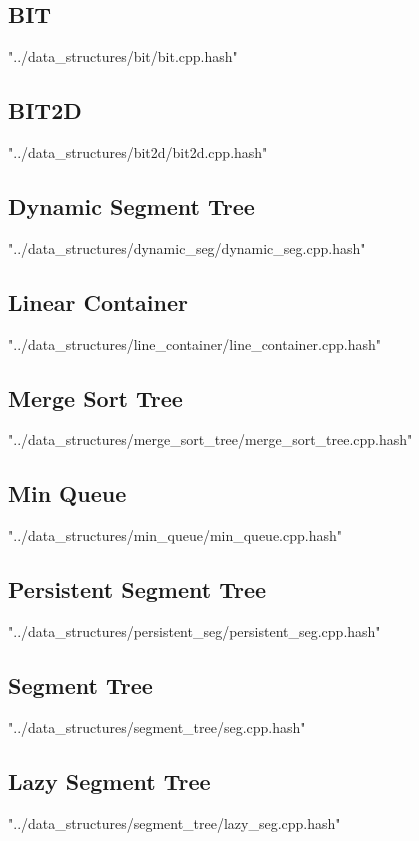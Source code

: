 \documentclass [a4paper,5pt,oneside, landscape]{article}
\begin{document}
\begin{multicols}{3}
\subsection{ BIT}
 {"../data_structures/bit/bit.cpp.hash"}


\subsection{ BIT2D}
 {"../data_structures/bit2d/bit2d.cpp.hash"}


\subsection{ Dynamic Segment Tree}
 {"../data_structures/dynamic_seg/dynamic_seg.cpp.hash"}


\subsection{ Linear Container}
 {"../data_structures/line_container/line_container.cpp.hash"}


\subsection{ Merge Sort Tree}
 {"../data_structures/merge_sort_tree/merge_sort_tree.cpp.hash"}


\subsection{ Min Queue}
 {"../data_structures/min_queue/min_queue.cpp.hash"}


\subsection{ Persistent Segment Tree}
 {"../data_structures/persistent_seg/persistent_seg.cpp.hash"}


\subsection{ Segment Tree}
 {"../data_structures/segment_tree/seg.cpp.hash"}


\subsection{ Lazy Segment Tree}
 {"../data_structures/segment_tree/lazy_seg.cpp.hash"}



\end{multicols}
\end{document}

